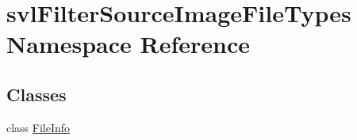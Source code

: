 \hypertarget{namespacesvl_filter_source_image_file_types}{\section{svl\-Filter\-Source\-Image\-File\-Types Namespace Reference}
\label{namespacesvl_filter_source_image_file_types}
}
\subsection*{Classes}
\begin{DoxyCompactItemize}
\item 
class \hyperlink{classsvl_filter_source_image_file_types_1_1_file_info}{File\-Info}
\end{DoxyCompactItemize}
